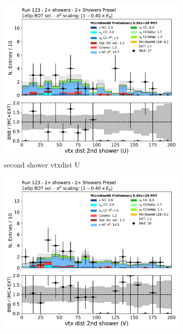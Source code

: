 \begin{figure}[H]
    \centering
    \begin{subfigure}{0.3\textwidth}
    \includegraphics[width=1.0\textwidth]{Sidebands/Figures/TwoShr_1e0pSel/BDT/secondshower_U_vtxdist.pdf}
    \caption{second shower vtxdist U}
    \end{subfigure}
    \begin{subfigure}{0.3\textwidth}
    \includegraphics[width=1.0\textwidth]{Sidebands/Figures/TwoShr_1e0pSel/BDT/secondshower_V_vtxdist.pdf}

\end{subfigure}
\end{figure}
